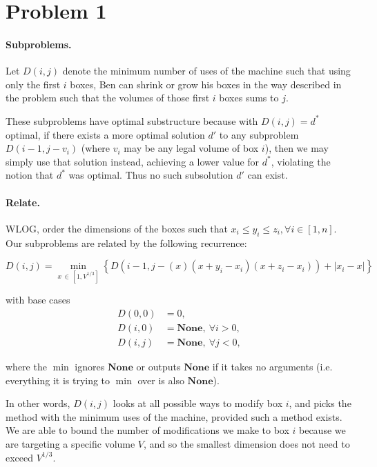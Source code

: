 \documentclass{6046}
\author{Matthew Feng}
\begin{document}

\section*{Problem 1}

\paragraph{Subproblems.}
Let $D(i, j)$ denote the minimum number of uses
of the machine such that using only the first $i$ boxes,
Ben can shrink or grow his boxes in the way described in the
problem such that the volumes of those first $i$ boxes sums to $j$.

These subproblems have optimal substructure because
with $D(i, j) = d^*$ optimal, if there exists
a more optimal solution $d'$ to any subproblem $D(i - 1, j - v_i)$
(where $v_i$ may be any legal volume of box $i$), then
we may simply use that solution instead, achieving a lower
value for $d^*$, violating the notion that $d^*$ was optimal.
Thus no such subsolution $d'$ can exist.

\vspace{-1em}
\paragraph{Relate.}
WLOG, order the dimensions of the boxes such that $x_i \le y_i \le z_i,
\forall i \in [1, n]$.
Our subproblems are related by the following recurrence:

\[
D(i, j) = \min_{x\,\in\,[1, V^{1/3}]}
\left\{
D(i - 1, j - (x)(x + y_i - x_i)(x + z_i - x_i)) + |x_i - x|
\right\}
\]

with base cases
\begin{align*}
D(0, 0) & = 0,\\
D(i, 0) & = \textbf{None},\ \forall i > 0,\\
D(i, j) & = \textbf{None},\ \forall j < 0,
\end{align*}

where the $\min$ ignores $\textbf{None}$ or outputs $\textbf{None}$
if it takes no arguments (i.e. everything it is trying to $\min$
over is also $\textbf{None}$).

In other words, $D(i, j)$ looks at all possible ways to modify
box $i$, and picks the method with the minimum uses of the machine,
provided such a method exists. We are able to bound
the number of modifications we make to box $i$
because we are targeting a specific volume $V$,
and so the smallest dimension does not need to
exceed $V^{1/3}$.
\end{document}
